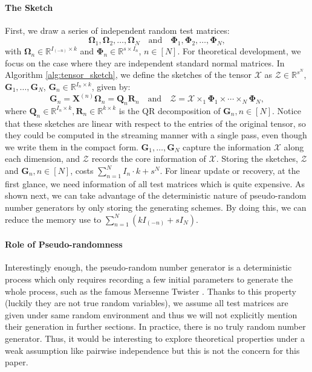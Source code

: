 \paragraph{The Sketch}  First, we draw a series of independent random test matrices: 
\begin{equation} 
\label{sketches}
\mathbf{\Omega}_1, \mathbf{\Omega}_2, \dots, \mathbf{\Omega}_N \quad \text{and} \quad \mathbf{\Phi}_1, \mathbf{\Phi}_2, \dots, \mathbf{\Phi}_N,
\end{equation}
with $\mathbf{\Omega}_n \in \mathbb{R}^{I_{(-n)} \times k}$ and $\mathbf{\Phi}_n \in \mathbb{R}^{s\times I_n}$, $n \in [N]$. For theoretical development, we focus on the case where they are independent standard normal matrices. 
In Algorithm \ref{alg:tensor_sketch}, we define the sketches of the tensor $\mathscr{X}$ as $\mathscr{Z} \in \mathbb{R}^{s^N} $, $\mathbf{G}_1, \dots, \mathbf{G}_N$, $\mathbf{G}_n \in \mathbb{R}^{I_n \times k}$, given by: 
\begin{equation}
\label{eq:sketchy_matrix}
\mathbf{G}_n = \mathbf{X}^{(n)}\mathbf{\Omega}_n   = \mathbf{Q}_n\mathbf{R}_n \quad \text{and} \quad \mathscr{Z} = \mathscr{X} \times_1 \mathbf{\Phi}_1 \times \cdots \times_N \mathbf{\Phi}_N, 
\end{equation}
where $\mathbf{Q}_n \in \mathbb{R}^{I_n \times k}, \mathbf{R}_n \in \mathbb{R}^{k\times k}$ is the QR decomposition of $\mathbf{G}_n , n\in [N]$. Notice that these sketches are linear with respect to the entries of the original tensor, so they could be computed in the streaming manner with a single pass, even though we write them in the compact form. $\mathbf{G}_1, \dots, \mathbf{G}_N$ capture the information $\mathscr{X}$ along each dimension, and $\mathscr{Z}$ records the core information of $\mathscr{X}$. Storing the sketches, $\mathscr{Z}$ and $\mathbf{G}_n, n \in [N]$, costs $\sum_{n=1}^N I_n\cdot k + s^N $. For linear update or recovery, at the first glance, we need information of all test matrices which is quite expensive. As shown next, we can take advantage of the deterministic nature of pseudo-random number generators by only storing the generating schemes. By doing this, we can reduce the memory use to $\sum_{n = 1}^N (kI_{(-n)}+sI_N)$.

\paragraph{Role of Pseudo-randomness} Interestingly enough, the pseudo-random number generator is a deterministic process which only requires recording a few initial parameters to generate the whole process, such as the famous Mersenne Twister \citep{matsumoto1998mersenne}. Thanks to this property (luckily they are not true random variables), we assume all test matrices are given under same random environment and thus we will not explicitly mention their generation in further sections. In practice, there is no truly random number generator. Thus, it would be interesting to explore theoretical properties under a weak assumption like pairwise independence but this is not the concern for this paper. 

